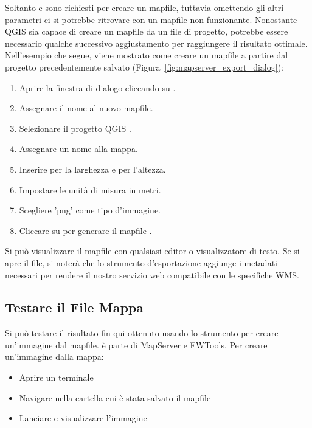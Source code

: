 Soltanto  e  sono richiesti per creare un 
mapfile, tuttavia omettendo gli altri parametri ci si potrebbe ritrovare con un mapfile non funzionante.
Nonostante QGIS sia capace di creare un mapfile da un file di progetto, potrebbe essere necessario 
qualche successivo aggiustamento per raggiungere il risultato ottimale. 
Nell'esempio che segue, viene mostrato come creare un mapfile a partire dal progetto
 precedentemente salvato (Figura~\ref{fig:mapserver_export_dialog}):

\begin{enumerate}
  \item Aprire la finestra di dialogo  cliccando su
  .
  \item Assegnare il nome  al nuovo mapfile.
  \item Selezionare il progetto QGIS .
  \item Assegnare un nome alla mappa.
  \item Inserire  per la larghezza e  per l'altezza.
  \item Impostare le unità di misura in metri.
  \item Scegliere 'png' come tipo d'immagine.
  \item Cliccare su  per generare il mapfile . 
\end{enumerate}

Si può visualizzare il mapfile con qualsiasi editor o visualizzatore di testo. 
Se si apre il file, si noterà che lo strumento d'esportazione aggiunge i metadati necessari 
per rendere il nostro servizio web compatibile con le specifiche WMS. 

\subsection{Testare il File Mappa}

Si può testare il risultato fin qui ottenuto usando lo strumento  per creare 
un'immagine dal mapfile.  è parte di MapServer e FWTools. 
Per creare un'immagine dalla mappa:

\begin{itemize}[label=--]
\item Aprire un terminale
\item Navigare nella cartella cui è stata salvato il mapfile
\item Lanciare  e visualizzare l'immagine 
\end{itemize}
 
